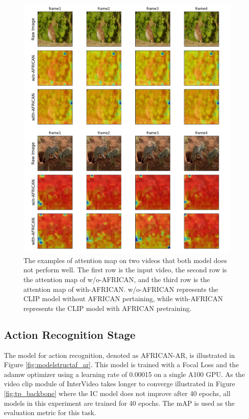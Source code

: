 \begin{figure}[ht]
    \centering
    \includegraphics[width=1.0\textwidth]{assets/charts/4_5_AttentionMaps_4}
    \caption[Attention Map 4 (Bad examples)]{The examples of attention map on two videos that both model does not perform well. The first row is the input video, the second row is the attention map of w/o-AFRICAN, and the third row is the attention map of with-AFRICAN. w/o-AFRICAN represents the CLIP model without AFRICAN pertaining, while with-AFRICAN represents the CLIP model with AFRICAN pretraining.}
    \label{fig:attnmap4}
\end{figure}






\subsection{Action Recognition Stage}
The model for action recognition, denoted as AFRICAN-AR, is illustrated in Figure \ref{fig:modelstructaf_ar}. This model is trained with a Focal Loss and the adamw optimizer using a learning rate of 0.00015 on a single A100 GPU. As the video clip module of InterVideo takes longer to converge illustrated in Figure \ref{fig:tp_backbone} where the IC model does not improve after 40 epochs, all models in this experiment are trained for 40 epochs. The mAP is used as the evaluation metric for this task.

